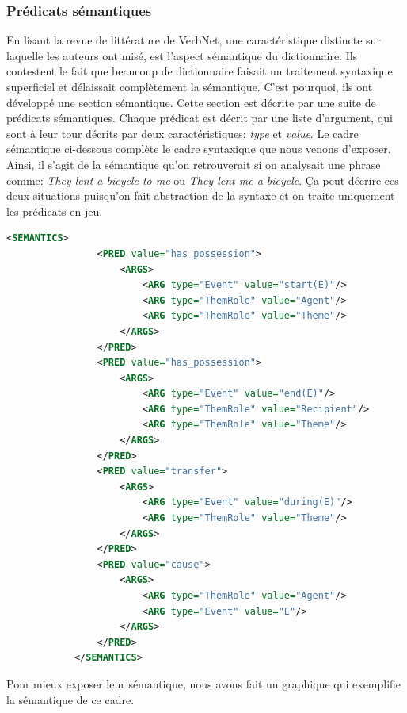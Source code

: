 \subsubsection{Prédicats sémantiques}

En lisant la revue de littérature de VerbNet, une caractéristique distincte sur laquelle les auteurs ont misé, est l'aspect sémantique du dictionnaire. Ils contestent le fait que beaucoup de dictionnaire faisait un traitement syntaxique superficiel et délaissait complètement la sémantique. C'est pourquoi, ils ont développé une section sémantique. Cette section est décrite par une suite de prédicats sémantiques. Chaque prédicat est décrit par une liste d'argument, qui sont à leur tour décrits par deux caractéristiques: \emph{type} et \emph{value}.  Le cadre sémantique ci-dessous complète le cadre syntaxique que nous venons d'exposer. Ainsi, il s'agit de la sémantique qu'on retrouverait si on analysait une phrase comme: \emph{They lent a bicycle to me} ou \emph{They lent me a bicycle}. Ça peut décrire ces deux situations puisqu'on fait abstraction de la syntaxe et on traite uniquement les prédicats en jeu.

\begin{lstlisting}[language=Xml, caption=Les prédicats sémantiques]
<SEMANTICS>
                <PRED value="has_possession">
                    <ARGS>
                        <ARG type="Event" value="start(E)"/>
                        <ARG type="ThemRole" value="Agent"/>
                        <ARG type="ThemRole" value="Theme"/>
                    </ARGS>
                </PRED>
                <PRED value="has_possession">
                    <ARGS>
                        <ARG type="Event" value="end(E)"/>
                        <ARG type="ThemRole" value="Recipient"/>
                        <ARG type="ThemRole" value="Theme"/>
                    </ARGS>
                </PRED>
                <PRED value="transfer">
                    <ARGS>
                        <ARG type="Event" value="during(E)"/>
                        <ARG type="ThemRole" value="Theme"/>
                    </ARGS>
                </PRED>
                <PRED value="cause">
                    <ARGS>
                        <ARG type="ThemRole" value="Agent"/>
                        <ARG type="Event" value="E"/>
                    </ARGS>
                </PRED>
            </SEMANTICS>
\end{lstlisting}

Pour mieux exposer leur sémantique, nous avons fait un graphique qui exemplifie la sémantique de ce cadre.

